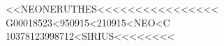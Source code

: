 \documentclass[b6paper,10pt]{article}
\begin{document}
\begin{minipage}[b][110mm][t]{77mm}

            {\color{Sepia}}

            \vfill

            {\large\color{Sepia}
                {<<NEONERUTHES<<<<<<<<<<<<<<<<}\\
                {G00018523<950915<210915<NEO<C}\\
                {10378123998712<SIRIUS<<<<<<<<}
            }\vspace{1pt}

        \end{minipage}\hfill%
\end{document}
